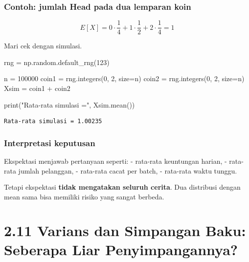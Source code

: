 \documentclass[
  letterpaper,
  DIV=11,
  numbers=noendperiod]{scrreprt}
\newenvironment{Shaded}{\begin{snugshade}}{\end{snugshade}}
\newcommand{\BuiltInTok}[1]{\textcolor[rgb]{0.00,0.23,0.31}{#1}}
\newcommand{\DecValTok}[1]{\textcolor[rgb]{0.68,0.00,0.00}{#1}}
\newcommand{\NormalTok}[1]{\textcolor[rgb]{0.00,0.23,0.31}{#1}}
\newcommand{\OperatorTok}[1]{\textcolor[rgb]{0.37,0.37,0.37}{#1}}
\newcommand{\StringTok}[1]{\textcolor[rgb]{0.13,0.47,0.30}{#1}}
\begin{document}
\subsubsection{Contoh: jumlah Head pada dua lemparan
koin}\label{contoh-jumlah-head-pada-dua-lemparan-koin-1}

\[
E[X] = 0 \cdot \frac14 + 1 \cdot \frac12 + 2 \cdot \frac14 = 1
\]

Mari cek dengan simulasi.

\begin{Shaded}
\begin{Highlighting}[]
\NormalTok{rng }\OperatorTok{=}\NormalTok{ np.random.default\_rng(}\DecValTok{123}\NormalTok{)}

\NormalTok{n }\OperatorTok{=} \DecValTok{100000}
\NormalTok{coin1 }\OperatorTok{=}\NormalTok{ rng.integers(}\DecValTok{0}\NormalTok{, }\DecValTok{2}\NormalTok{, size}\OperatorTok{=}\NormalTok{n)}
\NormalTok{coin2 }\OperatorTok{=}\NormalTok{ rng.integers(}\DecValTok{0}\NormalTok{, }\DecValTok{2}\NormalTok{, size}\OperatorTok{=}\NormalTok{n)}
\NormalTok{Xsim }\OperatorTok{=}\NormalTok{ coin1 }\OperatorTok{+}\NormalTok{ coin2}

\BuiltInTok{print}\NormalTok{(}\StringTok{"Rata{-}rata simulasi ="}\NormalTok{, Xsim.mean())}
\end{Highlighting}
\end{Shaded}

\begin{verbatim}
Rata-rata simulasi = 1.00235
\end{verbatim}

\subsubsection{Interpretasi keputusan}\label{interpretasi-keputusan-1}

Ekspektasi menjawab pertanyaan seperti: - rata-rata keuntungan harian, -
rata-rata jumlah pelanggan, - rata-rata cacat per batch, - rata-rata
waktu tunggu.

Tetapi ekspektasi \textbf{tidak mengatakan seluruh cerita}. Dua
distribusi dengan mean sama bisa memiliki risiko yang sangat berbeda.

\section{2.11 Varians dan Simpangan Baku: Seberapa Liar
Penyimpangannya?}\label{varians-dan-simpangan-baku-seberapa-liar-penyimpangannya}
\end{document}

